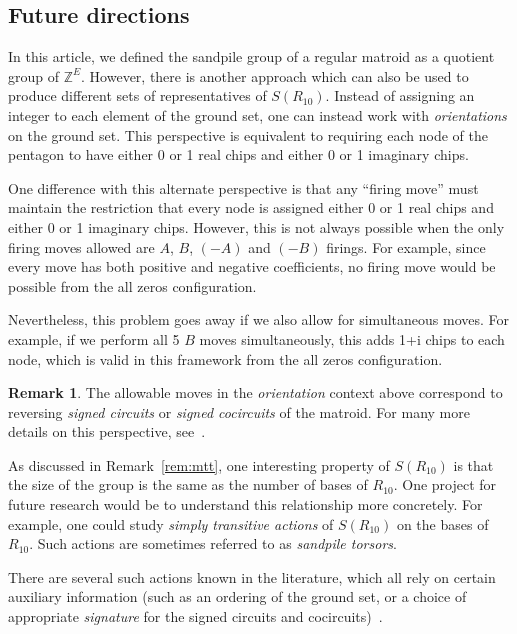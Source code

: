 \documentclass[12p]{amsart}
\numberwithin{equation}{section}
\theoremstyle{plain}
\theoremstyle{definition}
\newtheorem{remark}[thm]{Remark}
\newcommand{\Z}{\mathbb {Z}}
\begin{document}
\subsection{Future directions}

In this article, we defined the sandpile group of a regular matroid as a quotient group of $\Z^E$. However, there is another approach which can also be used to produce different sets of representatives of $S(R_{10})$. Instead of assigning an integer to each element of the ground set, one can instead work with \emph{orientations} on the ground set. This perspective is equivalent to requiring each node of the pentagon to have either 0 or 1 real chips and either 0 or 1 imaginary chips. 

One difference with this alternate perspective is that any ``firing move'' must maintain the restriction that every node is assigned either 0 or 1 real chips and either 0 or 1 imaginary chips. However, this is not always possible when the only firing moves allowed are $A$, $B$, $(-A)$ and $(-B)$ firings. For example, since every move has both positive and negative coefficients, no firing move would be possible from the all zeros configuration. 

Nevertheless, this problem goes away if we also allow for simultaneous moves. For example, if we perform all 5 $B$ moves simultaneously, this adds 1+i chips to each node, which is valid in this framework from the all zeros configuration. 

\begin{remark}The allowable moves in the \emph{orientation} context above correspond to reversing \emph{signed circuits} or \emph{signed cocircuits} of the matroid. For many more details on this perspective, see~\cite{Gioan}. \end{remark}

As discussed in Remark~\ref{rem:mtt}, one interesting property of $S(R_{10})$ is that the size of the group is the same as the number of bases of $R_{10}$. One project for future research would be to understand this relationship more concretely. For example, one could study \emph{simply transitive actions} of $S(R_{10})$ on the bases of $R_{10}$. Such actions are sometimes referred to as \emph{sandpile torsors}. 

There are several such actions known in the literature, which all rely on certain auxiliary information (such as an ordering of the ground set, or a choice of appropriate \emph{signature} for the signed circuits and cocircuits)~\cite{GLV,BBY,BSY,Ding}. 
\end{document}
